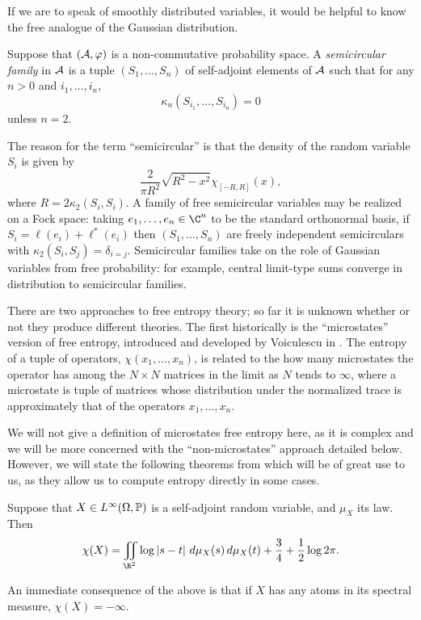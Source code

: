 If we are to speak of smoothly distributed variables, it would be helpful to know the free analogue of the Gaussian distribution.
\begin{definition}
	Suppose that $(\A, \varphi)$ is a non-commutative probability space.
	A \emph{semicircular family} in $\A$ is a tuple $(S_1, \ldots, S_n)$ of self-adjoint elements of $\A$ such that for any $n > 0$ and $i_1, \ldots, i_n$,
	$$\kappa_{n}(S_{i_1}, \ldots, S_{i_n}) = 0$$
	unless $n = 2$.
\end{definition}

The reason for the term ``semicircular'' is that the density of the random variable $S_i$ is given by
$$\frac{2}{\pi R^2}\sqrt{R^2-x^2}\chi_{[-R, R]}(x),$$
where $R = 2\kappa_2(S_i, S_i)$.
A family of free semicircular variables may be realized on a Fock space: taking $e_1, \ldots, e_n \in \C^n$ to be the standard orthonormal basis, if $S_i = \ell(e_i) + \ell^*(e_i)$ then $(S_1, \ldots, S_n)$ are freely independent semicirculars with $\kappa_2(S_i, S_j) = \delta_{i=j}$.
Semicircular families take on the role of Gaussian variables from free probability: for example, central limit-type sums converge in distribution to semicircular families.

There are two approaches to free entropy theory; so far it is unknown whether or not they produce different theories.
The first historically is the ``microstates'' version of free entropy, introduced and developed by Voiculescu in \cite{voiculescu1993fisher,voiculescu1994fisher,voiculescu1996fisher,voiculescu1997analogues}.
The entropy of a tuple of operators, $\chi(x_1, \ldots, x_n)$, is related to the how many microstates the operator has among the $N\times N$ matrices in the limit as $N$ tends to $\infty$, where a microstate is tuple of matrices whose distribution under the normalized trace is approximately that of the operators $x_1, \ldots, x_n$.

We will not give a definition of microstates free entropy here, as it is complex and we will be more concerned with the ``non-microstates'' approach detailed below.
However, we will state the following theorems from \cite{voiculescu1994fisher} which will be of great use to us, as they allow us to compute entropy directly in some cases.
\begin{theorem}
	\label{thm:singlevariableentropy}
	Suppose that $X \in L^\infty(\Omega, \P)$ is a self-adjoint random variable, and $\mu_X$ its law.
	Then
	$$\chi(X) = \iint_{\R^2}\log\abs{s-t}\,d\mu_X(s)\,d\mu_X(t) + \frac34 + \frac12\log2\pi.$$
\end{theorem}
An immediate consequence of the above is that if $X$ has any atoms in its spectral measure, $\chi(X) = -\infty$.

